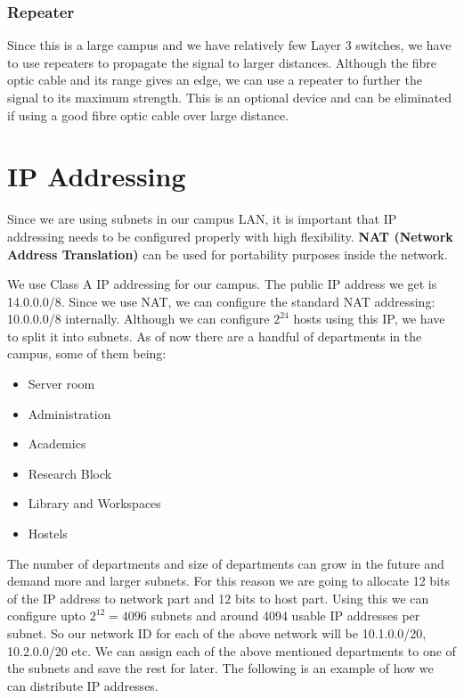 \documentclass{article}
\begin{document}
\subsubsection{Repeater}
Since this is a large campus and we have relatively few Layer 3 switches, we have to use repeaters to propagate the signal to larger distances. Although the fibre optic cable and its range gives an edge, we can use a repeater to further the signal to its maximum strength. This is an optional device and can be eliminated if using a good fibre optic cable over large distance.

\section{IP Addressing}
Since we are using subnets in our campus LAN, it is important that IP addressing needs to be configured properly with high flexibility. \textbf{NAT (Network Address Translation)} can be used for portability purposes inside the network.
\par
We use Class A IP addressing for our campus. The public IP address we get is 14.0.0.0/8. Since we use NAT, we can configure the standard NAT addressing: 10.0.0.0/8 internally. Although we can configure $2^{24}$ hosts using this IP, we have to split it into subnets. As of now there are a handful of departments in the campus, some of them being:
\begin{itemize}
	\item Server room
	\item Administration
	\item Academics
	\item Research Block
	\item Library and Workspaces
	\item Hostels
\end{itemize}

The number of departments and size of departments can grow in the future and demand more and larger subnets. For this reason we are going to allocate 12 bits of the IP address to network part and 12 bits to host part. Using this we can configure upto $2^{12}=4096$ subnets and around 4094 usable IP addresses per subnet. So our network ID for each of the above network will be 10.1.0.0/20, 10.2.0.0/20 etc. We can assign each of the above mentioned departments to one of the subnets and save the rest for later. The following is an example of how we can distribute IP addresses.
\end{document}
